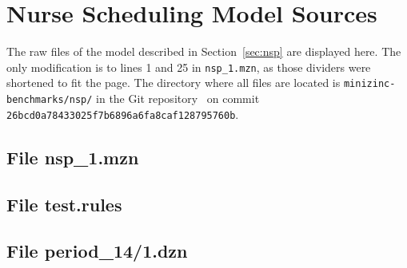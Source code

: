 \documentclass[a4paper,12pt]{article}
\newif\iffast
\begin{document}
\newpage
\appendix

\iffast\else
\section{Nurse Scheduling Model Sources}\label{app:nsp}
The raw files of the model described in Section~\ref{sec:nsp} are displayed here. The only
modification is to lines 1 and 25 in \texttt{nsp\_1.mzn}, as those dividers were shortened to
fit the page. The directory where all files are located is
\texttt{minizinc-benchmarks/nsp/} in the Git repository~\cite{mznbench} on commit
\texttt{26bcd0a78433025f7b6896a6fa8c\-af128795760b}.
\subsection{File nsp\_1.mzn}

\subsection{File test.rules}

\subsection{File period\_14/1.dzn}

\fi
\end{document}
